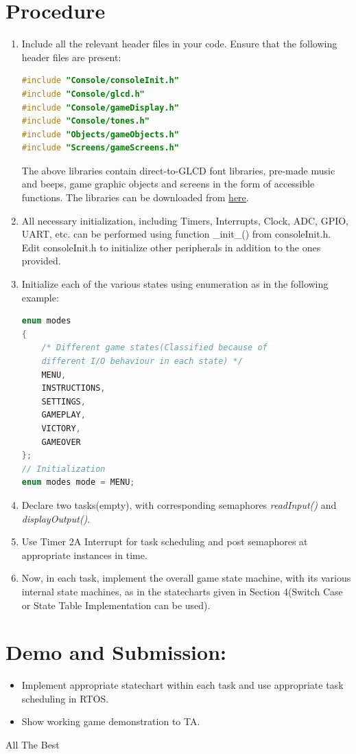\documentclass{article}
\begin{document}
\section{Procedure}
\begin{enumerate}
\item \qquad Include all the relevant header files in your code. Ensure that the following header
files are present:
\begin{lstlisting}[basicstyle = \small, language = C]
#include "Console/consoleInit.h"
#include "Console/glcd.h"
#include "Console/gameDisplay.h"
#include "Console/tones.h"
#include "Objects/gameObjects.h"
#include "Screens/gameScreens.h"
\end{lstlisting}
\qquad The above libraries contain direct-to-GLCD font libraries, pre-made music and beeps, game graphic objects and screens in the form of accessible functions. The libraries can be downloaded from \href{https://github.com/eYSIP-2017/eYSIP-2017_Game_Development-TI-RTOS/blob/master/Documentation/Breakout/Breakout\%20-\%20Lab\%20Manual/Console\%20Libraries.zip}{here}.
\item All necessary initialization, including Timers, Interrupts, Clock, ADC, GPIO, UART, etc. can be performed using function \_init\_() from consoleInit.h. Edit consoleInit.h to initialize other peripherals in addition to the ones provided.
\item Initialize each of the various states using enumeration as in the following example:
\begin{lstlisting}[basicstyle = \small, language = C]
enum modes
{
    /* Different game states(Classified because of 
    different I/O behaviour in each state) */
    MENU,
    INSTRUCTIONS,
    SETTINGS,
    GAMEPLAY,
    VICTORY,
    GAMEOVER
};
// Initialization
enum modes mode = MENU;
\end{lstlisting}
\item Declare two tasks(empty), with corresponding semaphores \textit{readInput()} and \textit{displayOutput()}.
\item Use Timer 2A Interrupt for task scheduling and post semaphores at appropriate instances in time.
\item Now, in each task, implement the overall game state machine, with its various internal state machines, as in the statecharts given in Section 4(Switch Case or State Table Implementation can be used).
\end{enumerate}
\section{Demo and Submission:}
\begin{itemize}
    \item Implement appropriate statechart within each task and use appropriate task scheduling in RTOS.
    \item Show working game demonstration to TA.
\end{itemize}
\begin{center}
\newline
   All The Best

 \end{center}
\end{document}
